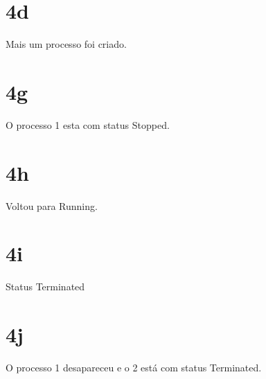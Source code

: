 \documentclass{article}
\begin{document}
\section*{4d}
Mais um processo foi criado.\\
\section*{4g}
O processo 1 esta com status Stopped.\\
\section*{4h}
Voltou para Running.\\
\section*{4i}
Status Terminated
\section*{4j}
O processo 1 desapareceu e o 2 está com status Terminated.\\
\end{document}
